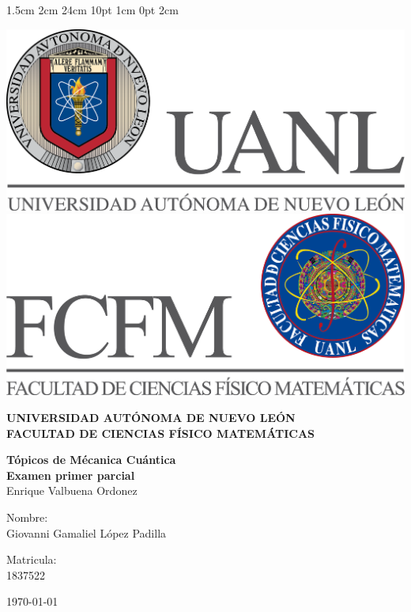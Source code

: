\documentclass[12pt,letterpaper]{article}
\begin{document}
\setmargins{2.5cm}      
{1.5cm}                     
{2cm}  
{24cm}                    
{10pt}                          
{1cm}                          
{0pt}                             
{2cm}
\begin{titlepage}
\begin{center}
\includegraphics[scale=0.40]{../../Logos/uanl.png} 
\hspace{2.5cm}
\includegraphics[scale=0.40]{../../Logos/fcfm.png}
\end{center}
\vspace{2cm}
\begin{center}
\textbf{
UNIVERSIDAD AUTÓNOMA DE NUEVO LEÓN\\
FACULTAD DE CIENCIAS
    FÍSICO MATEMÁTICAS}\\
\vspace*{2cm}
\begin{large}
\vspace{1cm}
\large{\textbf{Tópicos de Mécanica Cuántica}}\\
\textbf{Examen primer parcial}\\
Enrique Valbuena Ordonez\\
\end{large}
\vspace{3.5cm}
\begin{minipage}{0.6\linewidth}
\vspace{0.5cm}
\changefontsizes{14pt}
Nombre:\\
Giovanni Gamaliel López Padilla\\
\end{minipage}
\begin{minipage}{0.2\linewidth}
\changefontsizes{14pt}
Matricula:\\
1837522
\end{minipage}
\end{center}
\vspace{4cm}
\begin{flushright}
\today
\end{flushright}
\end{titlepage}
\end{document}
